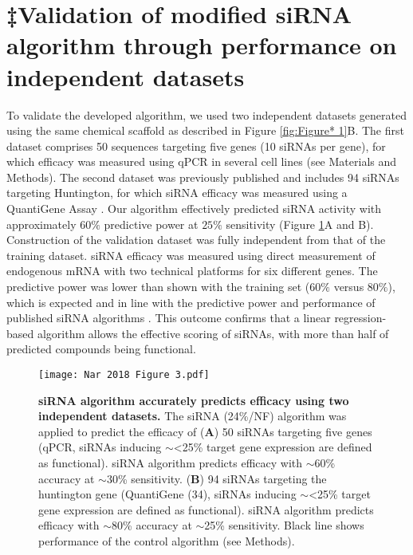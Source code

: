 \documentclass{report}
\begin{document}
 
\section{‡Validation of modified siRNA algorithm through performance on independent datasets}

To validate the developed algorithm, we used two independent datasets generated using the same chemical scaffold as described in Figure \ref{fig:Figure* 1}B. The first dataset comprises 50 sequences targeting five genes (10 siRNAs per gene), for which efficacy was measured using qPCR in several cell lines (see Materials and Methods). The second dataset was previously published and includes 94 siRNAs targeting Huntington, for which siRNA efficacy was measured using a QuantiGene Assay \cite{alterman_hydrophobically_2015}. Our algorithm effectively predicted siRNA activity with approximately $60\%$ predictive power at $25\%$ sensitivity (Figure \ref{fig:Figure‡ 3}A and B). Construction of the validation dataset was fully independent from that of the training dataset. siRNA efficacy was measured using direct measurement of endogenous mRNA with two technical platforms for six different genes. The predictive power was lower than shown with the training set ($60\%$ versus $80\%$), which is expected and in line with the predictive power and performance of published siRNA algorithms \cite{huesken_design_2005, he_predicting_2017, pan_sipred_2011}. This outcome confirms that a linear regression-based algorithm allows the effective scoring of siRNAs, with more than half of predicted compounds being functional.

\begin{figure}
    \centering
    \texttt{[image: Nar 2018 Figure 3.pdf]}
    \caption{\textbf{siRNA algorithm accurately predicts efficacy using two independent datasets.} The siRNA (24\%/NF) algorithm was applied to predict the efficacy of (\textbf{A}) 50 siRNAs targeting five genes (qPCR, siRNAs inducing $\sim$<25\% target gene expression are defined as functional). siRNA algorithm predicts efficacy with $\sim$60\% accuracy at $\sim$30\% sensitivity. (\textbf{B}) 94 siRNAs targeting the huntington gene (QuantiGene (34), siRNAs inducing $\sim$<25\% target gene expression are defined as functional). siRNA algorithm predicts efficacy with $\sim$80\% accuracy at $\sim$25\% sensitivity. Black line shows performance of the control algorithm (see Methods). 
}
    \label{fig:Figure‡ 3}
\end{figure}
\end{document}
